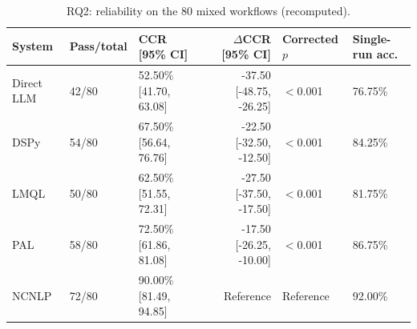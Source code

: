\begin{table}[!htbp]
\centering
\caption{RQ2: reliability on the 80 mixed workflows (recomputed).}
\label{tab:rq2-main}
\footnotesize\setlength{\tabcolsep}{3pt}
\begin{tabular*}{\linewidth}{@{\extracolsep{\fill}}lllrl@{}}
\toprule
System & Pass/total & CCR [95\% CI] & $\Delta$CCR [95\% CI] & Corrected $p$ & Single-run acc. \\
\midrule
Direct LLM & 42/80 & 52.50\% [41.70, 63.08] & -37.50 [-48.75, -26.25] & $<$0.001 & 76.75\% \\
DSPy & 54/80 & 67.50\% [56.64, 76.76] & -22.50 [-32.50, -12.50] & $<$0.001 & 84.25\% \\
LMQL & 50/80 & 62.50\% [51.55, 72.31] & -27.50 [-37.50, -17.50] & $<$0.001 & 81.75\% \\
PAL & 58/80 & 72.50\% [61.86, 81.08] & -17.50 [-26.25, -10.00] & $<$0.001 & 86.75\% \\
NCNLP & 72/80 & 90.00\% [81.49, 94.85] & Reference & Reference & 92.00\% \\
\bottomrule
\end{tabular*}
\end{table}
